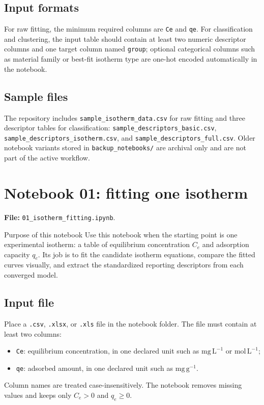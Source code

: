 \documentclass[journal=jacsat,manuscript=article]{achemso}
\begin{document}
\subsection{Input formats}
\label{sec:si_notebook_inputs}

For raw fitting, the minimum required columns are \texttt{Ce} and \texttt{qe}.
For classification and clustering, the input table should contain at least two
numeric descriptor columns and one target column named \texttt{group}; optional
categorical columns such as material family or best-fit isotherm type are
one-hot encoded automatically in the notebook.

\subsection{Sample files}
\label{sec:si_notebook_samples}

The repository includes \texttt{sample\_isotherm\_data.csv} for raw fitting and
three descriptor tables for classification:
\texttt{sample\_descriptors\_basic.csv},
\texttt{sample\_descriptors\_isotherm.csv}, and
\texttt{sample\_descriptors\_full.csv}. Older notebook variants stored in
\texttt{backup\_notebooks/} are archival only and are not part of the active
workflow.

\appendix

\section{Notebook 01: fitting one isotherm}
\label{app:si_notebook_01}

\noindent\textbf{File:} \texttt{01\_isotherm\_fitting.ipynb}.

\begin{bluebox}{Purpose of this notebook}
	Use this notebook when the starting point is one experimental isotherm:
	a table of equilibrium concentration \(C_e\) and adsorption capacity
	\(q_e\). Its job is to fit the candidate isotherm equations, compare
	the fitted curves visually, and extract the standardized reporting descriptors from
	each converged model.
\end{bluebox}

\subsection*{Input file}

Place a \texttt{.csv}, \texttt{.xlsx}, or \texttt{.xls} file in the notebook
folder. The file must contain at least two columns:
\begin{itemize}
	\item \texttt{Ce}: equilibrium concentration, in one declared unit such as
	\(\mathrm{mg\,L^{-1}}\) or \(\mathrm{mol\,L^{-1}}\);
	\item \texttt{qe}: adsorbed amount, in one declared unit such as
	\(\mathrm{mg\,g^{-1}}\).
\end{itemize}
Column names are treated case-insensitively. The notebook removes missing
values and keeps only \(C_e>0\) and \(q_e\geq 0\).
\end{document}
